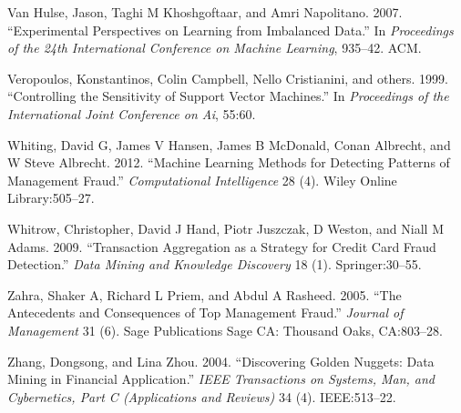 \documentclass[12pt,]{article}
\begin{document}
\leavevmode\hypertarget{ref-van2007experimental}{}%
Van Hulse, Jason, Taghi M Khoshgoftaar, and Amri Napolitano. 2007.
``Experimental Perspectives on Learning from Imbalanced Data.'' In
\emph{Proceedings of the 24th International Conference on Machine
Learning}, 935--42. ACM.

\leavevmode\hypertarget{ref-veropoulos1999controlling}{}%
Veropoulos, Konstantinos, Colin Campbell, Nello Cristianini, and others.
1999. ``Controlling the Sensitivity of Support Vector Machines.'' In
\emph{Proceedings of the International Joint Conference on Ai}, 55:60.

\leavevmode\hypertarget{ref-whiting2012machine}{}%
Whiting, David G, James V Hansen, James B McDonald, Conan Albrecht, and
W Steve Albrecht. 2012. ``Machine Learning Methods for Detecting
Patterns of Management Fraud.'' \emph{Computational Intelligence} 28
(4). Wiley Online Library:505--27.

\leavevmode\hypertarget{ref-whitrow2009transaction}{}%
Whitrow, Christopher, David J Hand, Piotr Juszczak, D Weston, and Niall
M Adams. 2009. ``Transaction Aggregation as a Strategy for Credit Card
Fraud Detection.'' \emph{Data Mining and Knowledge Discovery} 18 (1).
Springer:30--55.

\leavevmode\hypertarget{ref-zahra2005antecedents}{}%
Zahra, Shaker A, Richard L Priem, and Abdul A Rasheed. 2005. ``The
Antecedents and Consequences of Top Management Fraud.'' \emph{Journal of
Management} 31 (6). Sage Publications Sage CA: Thousand Oaks,
CA:803--28.

\leavevmode\hypertarget{ref-zhang2004discovering}{}%
Zhang, Dongsong, and Lina Zhou. 2004. ``Discovering Golden Nuggets: Data
Mining in Financial Application.'' \emph{IEEE Transactions on Systems,
Man, and Cybernetics, Part C (Applications and Reviews)} 34 (4).
IEEE:513--22.
\end{document}
